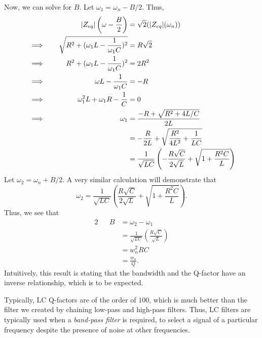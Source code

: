 \documentclass[letterpaper]{article}
\theoremstyle{remark}
\DeclarePairedDelimiter\abs{\lvert}{\rvert}%
\newcommand{\eqn}[1]{\begin{alignat*}{2}#1\end{alignat*}}
\newcommand*{\thus}{&\implies\quad&}
\begin{document}
Now, we can solve for $B$. Let $\omega_1 = \omega_n - B/2$. Thus,
\eqn{
    && \abs{Z_{eq}}\left(\omega - \frac{B}{2}\right) &= \sqrt{2} (\abs{Z_{eq}}(\omega_n)) \\
    \thus \sqrt{R^2 + (\omega_1 L - \frac{1}{\omega_1 C})^2} &= R\sqrt{2} \\
    \thus R^2 + (\omega_1 L - \frac{1}{\omega_1 C})^2 &= 2R^2 \\
    \thus \omega L - \frac{1}{\omega_1 C} &= -R \\
    \thus \omega_1^2 L + \omega_1 R - \frac{1}{C} &= 0 \\
    \thus \omega_1 &= \frac{-R + \sqrt{R^2 + 4L / C}}{2L} \\
    &&&= -\frac{R}{2L} + \sqrt{\frac{R^2}{4L^2} + \frac{1}{LC}} \\
    &&&= \frac{1}{\sqrt{LC}} \left(-\frac{R\sqrt{C}}{2\sqrt{L}} + \sqrt{1 + \frac{R^2C}{L}} \right) \\
}
Let $\omega_2 = \omega_n + B/2$. A very similar calculation will demonstrate that
\[
    \omega_2 = \frac{1}{\sqrt{LC}} \left(\frac{R\sqrt{C}}{2\sqrt{L}} + \sqrt{1 + \frac{R^2C}{L}} \right).
\]
Thus, we see that
\eqn{
    && B &= \omega_2 - \omega_1 \\
    &&&= \frac{1}{\sqrt{LC}} \left(\frac{R\sqrt{C}}{\sqrt{L}} \right) \\
    &&&= w_n^2 RC \\
    &&&= \frac{w_n}{Q}.
}
Intuitively, this result is stating that the bandwidth and the Q-factor have an inverse relationship, which is to be expected.

Typically, LC Q-factors are of the order of $100$, which is much better than the filter we created by chaining low-pass and high-pass filters. Thus, LC filters are typically used when a \emph{band-pass filter} is required, to select a signal of a particular frequency despite the presence of noise at other frequencies.
\end{document}
